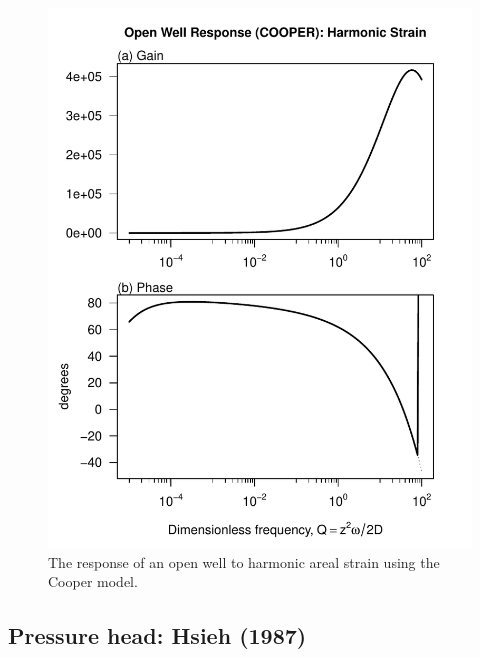 \documentclass[10pt]{article}\usepackage[]{graphicx}\usepackage[]{color}
\makeatletter
\def\maxwidth{ %
  \ifdim\Gin@nat@width>\linewidth
    \linewidth
  \else
    \Gin@nat@width
  \fi
}
\newenvironment{knitrout}{}{} %
\makeatother
\begin{document}
\begin{figure}[htb!]
\begin{center}
\begin{knitrout}
\color{fgcolor}
\includegraphics[width=\maxwidth]{figure/COOPERRESPFIG} 

\end{knitrout}

\caption{The response of an open well to harmonic areal strain using
the Cooper model. 
}
\label{fig:owrsp-coop}
\end{center}
\end{figure}

\subsection{Pressure head: Hsieh (1987)}
\citet{hsieh1987}
\end{document}
